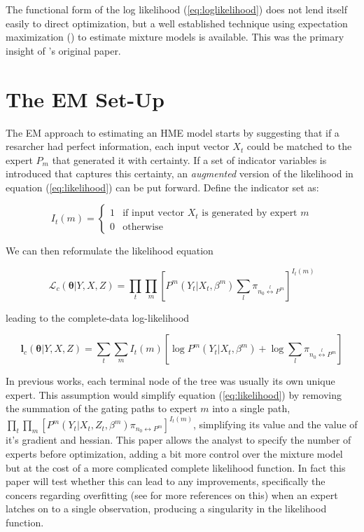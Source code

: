 \documentclass[12pt]{article}
\begin{document}
The functional form of the log likelihood (\ref{eq:loglikelihood}) does not
lend itself easily to direct optimization, but a well established
technique using expectation maximization (\cite{EM_DLR1977}) to estimate mixture
models is available. This was the primary insight of \cite{JordanJacobs1993}'s
original paper.

\section{The EM Set-Up}
The EM approach to estimating an HME model starts by suggesting that if a
resarcher had perfect information, each input vector $X_{t}$ could be matched
to the expert $P_{m}$ that generated it with certainty. If a set of indicator
variables is introduced that captures this certainty, an \textit{augmented}
version of the likelihood in equation (\ref{eq:likelihood}) can be put forward.
Define the indicator set as:

\begin{equation} \label{eq:indicator}
  I_{t}(m) = \begin{cases} 
     1 & \textrm{if input vector $X_{t}$ is generated by expert $m$} \\
     0 & \textrm{otherwise}
             \end{cases}
\end{equation}

We can then reformulate the likelihood equation

\begin{equation}  \label{eq:likelihood}
  \mathcal{L}_{c}(\boldsymbol{\theta}|Y, X, Z) = \prod_{t}\prod_{m}[P^{m}(Y_{t}|X_{t},\beta^{m})\sum_{l}\pi_{n_{0}\overset{l}{\longleftrightarrow} P^{m}}]^{I_{t}(m)}
\end{equation}

leading to the complete-data log-likelihood

\begin{equation}  \label{eq:loglikelihood}
  \boldsymbol{l}_{c}(\boldsymbol{\theta}|Y, X, Z) = \sum_{t}\sum_{m}I_{t}(m)[\log P^{m}(Y_{t}|X_{t},\beta^{m}) + \log\sum_{l}\pi_{n_{0}\overset{l}{\longleftrightarrow} P^{m}}]
\end{equation}

In previous works, each terminal node of the tree was usually its own unique
expert. This assumption would simplify equation (\ref{eq:likelihood})
by removing the summation of the gating paths to expert $m$ into a 
single path,
$\prod_{t}\prod_{m}[P^{m}(Y_{t}|X_{t}, Z_{t}, \beta^{m}) \pi_{n_{0} \longleftrightarrow P^{m}}]^{I_{t}(m)}$,
simplifying its value and the value of it's gradient and hessian. This paper
allows the analyst to specify the number of experts before optimization,
adding a bit more control over the mixture model but at the cost of a more
complicated complete likelihood function. In fact this paper will test whether
this can lead to any improvements, specifically the concers regarding overfitting
(see \cite{BishopSvenson2003} for more references on this) when an expert latches
on to a single observation, producing a singularity in the likelihood function.
\end{document}
